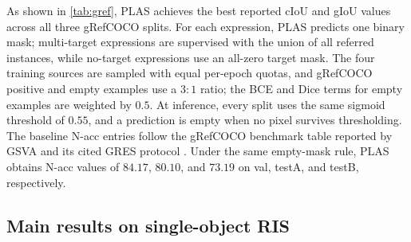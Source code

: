 As shown in \cref{tab:gref}, PLAS achieves
the best reported cIoU and gIoU values
across all three gRefCOCO splits. For each expression, PLAS predicts one binary mask; multi-target expressions are supervised with the union of all referred instances, while no-target expressions use an all-zero target mask. The four training sources are sampled with equal per-epoch quotas, and gRefCOCO positive and empty examples use a $3{:}1$ ratio; the BCE and Dice terms for empty examples are weighted by $0.5$. At inference, every split uses the same sigmoid threshold of $0.55$, and a prediction is empty when no pixel survives thresholding. The baseline N-acc entries follow the gRefCOCO benchmark table reported by GSVA and its cited GRES protocol \cite{Xia2024GSVA,Liu2023GRES}. Under the same empty-mask rule, PLAS obtains N-acc values of $84.17$, $80.10$, and $73.19$ on val, testA, and testB, respectively.


\subsection{Main results on single-object RIS}
\label{sec:single_results}


